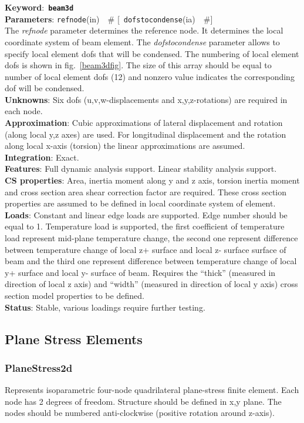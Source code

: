 \documentclass[a4paper]{article}
\newcommand{\descitem}[1]{{\noindent \bf #1}:}
\newcommand{\elemkeyword}[1]{\descitem{Keyword}~{\bf \texttt{#1}}}
\newcommand{\elemparam}[2]{{{\texttt{#1}\tiny (#2)}~~\#}}
\newcommand{\optelemparam}[2]{{[~\elemparam{#1}{#2}]}}
\newcommand{\param}[1]{{\em #1}}
\begin{document}
\elemkeyword{beam3d}\\
\descitem{Parameters} \elemparam{refnode}{in}
\optelemparam{dofstocondense}{ia}\\
The \param{refnode} parameter
determines the reference node. It determines the local coordinate
system of beam element. The \param{dofstocondense} parameter allows to
specify local element dofs that will be condensed. The numbering of
local element dofs is shown in fig.~\ref{beam3dfig}. The size of this
array should be equal to number of local element dofs (12) and nonzero
value indicates the corresponding dof will be condensed.\\
\descitem{Unknowns}
Six dofs (u,v,w-displacements and x,y,z-rotations) are required in each node.\\
\descitem{Approximation} Cubic  approximations of lateral displacement and
rotation (along local y,z axes) are used. For longitudinal displacement
and the rotation along local x-axis (torsion) the linear
approximations are assumed.\\
\descitem{Integration} Exact.\\
\descitem{Features} Full dynamic analysis support. Linear stability
analysis support.\\
\descitem{CS properties} Area, inertia moment along y and z axis, torsion inertia moment and 
cross section area shear correction factor are required. These
cross section properties are assumed to be defined in local coordinate
system of element.\\
\descitem{Loads}  Constant and linear edge loads are supported.
Edge number should be equal to 1. Temperature load is
supported, the first coefficient of temperature load represent
mid-plane temperature change, the second one represent difference
between temperature change of local z+ surface and local
z- surface surface of beam and the third one represent difference
between temperature change of local y+ surface and  local
y- surface of beam. Requires the ``thick'' (measured in direction of
local z axis) and ``width'' (measured in direction of local y axis) cross section
model properties to be defined.\\
\descitem{Status} Stable, various loadings require further testing.

\subsection{Plane Stress Elements}
\subsubsection{PlaneStress2d}
Represents isoparametric four-node quadrilateral plane-stress
finite element. Each node has 2 degrees of freedom.
Structure should be defined in x,y plane. 
The nodes should be numbered anti-clockwise (positive rotation around
z-axis). 
\end{document}
